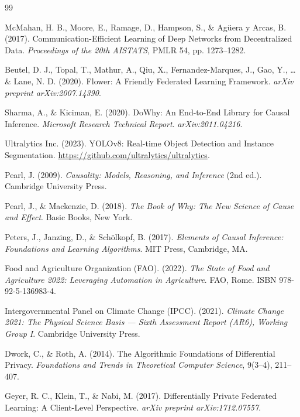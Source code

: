 \documentclass[12pt,a4paper]{report}
\begin{document}
\begin{thebibliography}{99}

McMahan, H. B., Moore, E., Ramage, D., Hampson, S., \& Agüera y Arcas, B. (2017). Communication-Efficient Learning of Deep Networks from Decentralized Data. \textit{Proceedings of the 20th AISTATS}, PMLR 54, pp. 1273--1282.

Beutel, D. J., Topal, T., Mathur, A., Qiu, X., Fernandez-Marques, J., Gao, Y., \ldots \& Lane, N. D. (2020). Flower: A Friendly Federated Learning Framework. \textit{arXiv preprint arXiv:2007.14390}.

Sharma, A., \& Kiciman, E. (2020). DoWhy: An End-to-End Library for Causal Inference. \textit{Microsoft Research Technical Report}. \textit{arXiv:2011.04216}.

Ultralytics Inc. (2023). YOLOv8: Real-time Object Detection and Instance Segmentation. \url{https://github.com/ultralytics/ultralytics}.

Pearl, J. (2009). \textit{Causality: Models, Reasoning, and Inference} (2nd ed.). Cambridge University Press.

Pearl, J., \& Mackenzie, D. (2018). \textit{The Book of Why: The New Science of Cause and Effect}. Basic Books, New York.

Peters, J., Janzing, D., \& Schölkopf, B. (2017). \textit{Elements of Causal Inference: Foundations and Learning Algorithms}. MIT Press, Cambridge, MA.

Food and Agriculture Organization (FAO). (2022). \textit{The State of Food and Agriculture 2022: Leveraging Automation in Agriculture}. FAO, Rome. ISBN 978-92-5-136983-4.

Intergovernmental Panel on Climate Change (IPCC). (2021). \textit{Climate Change 2021: The Physical Science Basis — Sixth Assessment Report (AR6), Working Group I}. Cambridge University Press.

Dwork, C., \& Roth, A. (2014). The Algorithmic Foundations of Differential Privacy. \textit{Foundations and Trends in Theoretical Computer Science}, 9(3--4), 211--407.

Geyer, R. C., Klein, T., \& Nabi, M. (2017). Differentially Private Federated Learning: A Client-Level Perspective. \textit{arXiv preprint arXiv:1712.07557}.


\end{thebibliography}
\end{document}
